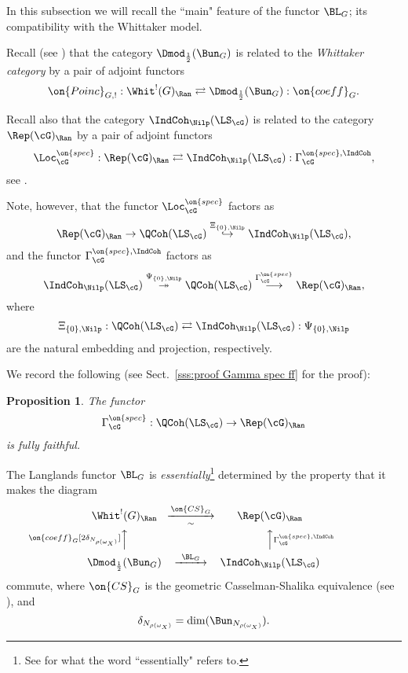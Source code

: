 \documentclass[9pt]{amsart}
\newtheorem{prop}[subsubsection]{Proposition}
\theoremstyle{remark}
\theoremstyle{definition}
\theoremstyle{remark}
\newcommand{\secref}[1]{Sect.~\ref{#1}}
\numberwithin{equation}{section}
\begin{document}

In this subsection we will recall the ``main" feature of the functor $\BL_G$; its compatibility with the Whittaker model. 

\sssec{}

Recall (see \cite[Sects. 9.3 and 9.4]{GLC2}) that the category $\Dmod_{\frac{1}{2}}(\Bun_G)$ is related to the
\emph{Whittaker category} by a pair of adjoint functors
$$\on{Poinc}_{G,!}:\Whit^!(G)_\Ran\rightleftarrows \Dmod_{\frac{1}{2}}(\Bun_G):\on{coeff}_G.$$

\sssec{}

Recall also that the category $\IndCoh_\Nilp(\LS_\cG)$ is related to the category $\Rep(\cG)_\Ran$ by a pair of adjoint functors
$$\Loc_\cG^{\on{spec}}:\Rep(\cG)_\Ran \rightleftarrows \IndCoh_\Nilp(\LS_\cG):\Gamma^{\on{spec},\IndCoh}_\cG,$$
see \cite[Sect. 17.6]{GLC2}.

\medskip

Note, however, that the functor $\Loc_\cG^{\on{spec}}$ factors as
$$\Rep(\cG)_\Ran \to \QCoh(\LS_\cG)\overset{\Xi_{\{0\},\Nilp}}\hookrightarrow \IndCoh_\Nilp(\LS_\cG),$$
and the functor $\Gamma^{\on{spec},\IndCoh}_\cG$ factors as
$$\IndCoh_\Nilp(\LS_\cG)\overset{\Psi_{\{0\},\Nilp}}\twoheadrightarrow \QCoh(\LS_\cG)\overset{\Gamma^{\on{spec}}_\cG}\longrightarrow \Rep(\cG)_\Ran,$$
where
$$\Xi_{\{0\},\Nilp}: \QCoh(\LS_\cG)\rightleftarrows \IndCoh_\Nilp(\LS_\cG):\Psi_{\{0\},\Nilp}$$
are the natural embedding and projection, respectively. 

\sssec{}

%

We record the following (see \secref{sss:proof Gamma spec ff} for the proof):

\begin{prop} \label{p:Gamma ff}
The functor 
$$\Gamma^{\on{spec}}_\cG:\QCoh(\LS_\cG)\to \Rep(\cG)_\Ran$$
is fully faithful.
\end{prop}

\sssec{}

The Langlands functor $\BL_G$ is 
\emph{essentially}\footnote{See \cite[Sects. 1.4 and 1.6]{GLC1} for what the word ``essentially" refers to.} 
determined by the property that it makes the diagram
\begin{equation} \label{e:L and coeff}
\CD
\Whit^!(G)_\Ran @>{\on{CS}_G}>{\sim}>  \Rep(\cG)_\Ran \\
@A{\on{coeff}_G[2\delta_{N_{\rho(\omega_X)}}]}AA @AA{\Gamma^{\on{spec},\IndCoh}_\cG}A \\
\Dmod_{\frac{1}{2}}(\Bun_G) @>{\BL_G}>>  \IndCoh_\Nilp(\LS_\cG)
\endCD
\end{equation} 
commute, where  $\on{CS}_G$ is the geometric Casselman-Shalika equivalence (see \cite[Sect. 1.4]{GLC2}),
and 
$$\delta_{N_{\rho(\omega_X)}}=\dim(\Bun_{N_{\rho(\omega_X)}}).$$
\end{document}
